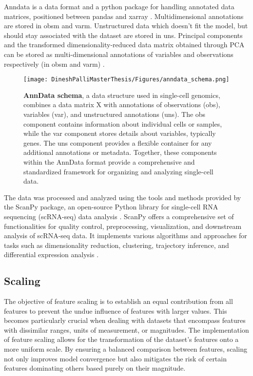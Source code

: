 \documentclass[12pt,a4paper]{article}
\begin{document}
Anndata is a data format and a python package for handling annotated data matrices, positioned between pandas and xarray \cite{virshup_rybakov_theis_angerer_wolf_2021}. Multidimensional annotations are stored in obsm and varm. Unstructured data which doesn’t fit the model, but should stay associated with the dataset are stored in uns. Principal components and the transformed dimensionality-reduced data matrix obtained through PCA can be stored as multi-dimensional annotations of variables and observations respectively (in obsm and varm) \cite{virshup_rybakov_theis_angerer_wolf_2021}.

\begin{figure}
  \centering
  \texttt{[image: DineshPalliMasterThesis/Figures/anndata\_schema.png]}
  \caption[AnnData Schema]{\textbf{AnnData schema}, a data structure used in single-cell genomics, combines a data matrix X with annotations of observations (obs), variables (var), and unstructured annotations (uns). The obs component contains information about individual cells or samples, while the var component stores details about variables, typically genes. The uns component provides a flexible container for any additional annotations or metadata. Together, these components within the AnnData format provide a comprehensive and standardized framework for organizing and analyzing single-cell data.}
  \label{adata}
\end{figure}

The data was processed and analyzed using the tools and methods provided by the ScanPy package, an open-source Python library for single-cell RNA sequencing (scRNA-seq) data analysis \cite{wolf_angerer_theis_2018}. ScanPy offers a comprehensive set of functionalities for quality control, preprocessing, visualization, and downstream analysis of scRNA-seq data. It implements various algorithms and approaches for tasks such as dimensionality reduction, clustering, trajectory inference, and differential expression analysis \cite{wolf_angerer_theis_2018}.

\subsection{Scaling}
The objective of feature scaling is to establish an equal contribution from all features to prevent the undue influence of features with larger values. This becomes particularly crucial when dealing with datasets that encompass features with dissimilar ranges, units of measurement, or magnitudes. The implementation of feature scaling allows for the transformation of the dataset’s features onto a more uniform scale. By ensuring a balanced comparison between features, scaling not only improves model convergence but also mitigates the risk of certain features dominating others based purely on their magnitude.
\end{document}
